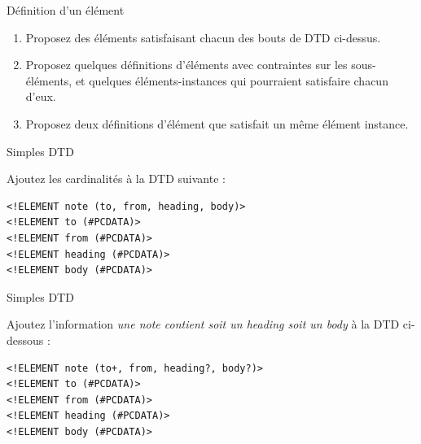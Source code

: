 \begin{frame}{Définition d'un élément}
\begin{itemize}
\begin{minipage}{0.9\textwidth}
\begin{exoblock}%
\begin{enumerate}
\item Proposez des éléments satisfaisant chacun des bouts de DTD ci-dessus.
\item Proposez quelques définitions d'éléments avec contraintes sur les sous-éléments, et quelques éléments-instances qui pourraient satisfaire chacun d'eux.
\item Proposez deux définitions d'élément que satisfait un même élément instance.
\end{enumerate}
\end{exoblock}
\end{minipage}

\end{itemize}

\end{frame}


\begin{frame}[containsverbatim]{Simples DTD}

\begin{exoblock}%
Ajoutez les cardinalités à la DTD suivante :
\begin{lstlisting}
<!ELEMENT note (to, from, heading, body)>
<!ELEMENT to (#PCDATA)>
<!ELEMENT from (#PCDATA)>
<!ELEMENT heading (#PCDATA)>
<!ELEMENT body (#PCDATA)>
\end{lstlisting}
\end{exoblock}

\end{frame}



\begin{frame}[containsverbatim]{Simples DTD}

\begin{exoblock}%
Ajoutez l'information
\textit{une note contient soit un \textit{heading} soit un \textit{body}} à la DTD ci-dessous :
\begin{lstlisting}[caption={Le mémo}]
<!ELEMENT note (to+, from, heading?, body?)>
<!ELEMENT to (#PCDATA)>
<!ELEMENT from (#PCDATA)>
<!ELEMENT heading (#PCDATA)>
<!ELEMENT body (#PCDATA)>
\end{lstlisting}
\end{exoblock}


\end{frame}


